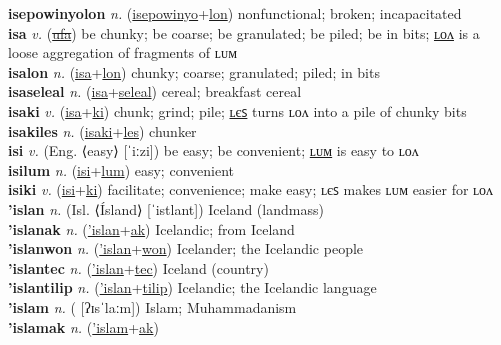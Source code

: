 \textbf{isepowinyolon} \textit{n.} (\hyperref[isepowinyo]{isepowinyo}+\hyperref[lon]{lon})
nonfunctional; broken; incapacitated \label{isepowinyolon} \\
\textbf{isa} \textit{v.} (\hyperref[ufa]{\sout{ufa}})
be chunky; be coarse; be granulated; be piled; be in bits; \hyperref[isalon]{ʟᴏᴧ} is a loose aggregation of fragments of ʟᴜᴍ \label{isa} \\
\textbf{isalon} \textit{n.} (\hyperref[isa]{isa}+\hyperref[lon]{lon})
chunky; coarse; granulated; piled; in bits \label{isalon} \\
\textbf{isaseleal} \textit{n.} (\hyperref[isa]{isa}+\hyperref[seleal]{seleal})
cereal; breakfast cereal \label{isaseleal} \\
\textbf{isaki} \textit{v.} (\hyperref[isa]{isa}+\hyperref[ki]{ki})
chunk; grind; pile; \hyperref[isakiles]{ʟєꜱ} turns ʟᴏᴧ into a pile of chunky bits \label{isaki} \\
\textbf{isakiles} \textit{n.} (\hyperref[isaki]{isaki}+\hyperref[les]{les})
chunker \label{isakiles} \\
\textbf{isi} \textit{v.} (Eng. ⟨easy⟩ [ˈiːzi])
be easy; be convenient; \hyperref[isilum]{ʟᴜᴍ} is easy to ʟᴏᴧ \label{isi} \\
\textbf{isilum} \textit{n.} (\hyperref[isi]{isi}+\hyperref[lum]{lum})
easy; convenient \label{isilum} \\
\textbf{isiki} \textit{v.} (\hyperref[isi]{isi}+\hyperref[ki]{ki})
facilitate; convenience; make easy; ʟєꜱ makes ʟᴜᴍ easier for ʟᴏᴧ \label{isiki} \\
\textbf{'islan} \textit{n.} (Isl. ⟨Ísland⟩ [ˈistlant])
Iceland (landmass) \label{'islan} \\
\textbf{'islanak} \textit{n.} (\hyperref['islan]{'islan}+\hyperref[ak]{ak})
Icelandic; from Iceland \label{'islanak} \\
\textbf{'islanwon} \textit{n.} (\hyperref['islan]{'islan}+\hyperref[won]{won})
Icelander; the Icelandic people \label{'islanwon} \\
\textbf{'islantec} \textit{n.} (\hyperref['islan]{'islan}+\hyperref[tec]{tec})
Iceland (country) \label{'islantec} \\
\textbf{'islantilip} \textit{n.} (\hyperref['islan]{'islan}+\hyperref[tilip]{tilip})
Icelandic; the Icelandic language \label{'islantilip} \\
\textbf{'islam} \textit{n.} ( [ʔɪsˈlaːm])
Islam; Muhammadanism \label{'islam} \\
\textbf{'islamak} \textit{n.} (\hyperref['islam]{'islam}+\hyperref[ak]{ak})
